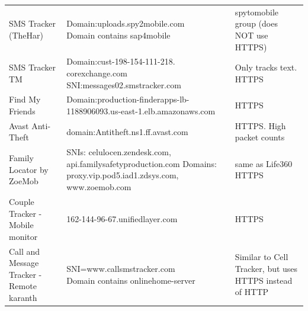 \documentclass[acmtog]{acmart}
\begin{document}
\begin{table}
\begin{tabular}{p{5cm}p{5cm}p{5cm}}
	SMS Tracker (TheHar) & \makecell{Domain:uploads.spy2mobile.com\\ Domain contains sap4mobile} & spytomobile group (does NOT use HTTPS) \\
	
	SMS Tracker TM & \makecell{Domain:cust-198-154-111-218.\\corexchange.com \\ SNI:messages02.smstracker.com} & Only tracks text. HTTPS \\
	
	Find My Friends & Domain:production-finderapps-lb-1188906093.us-east-1.elb.amazonaws.com & HTTPS\\
	
	Avast Anti-Theft & domain:Antitheft.ns1.ff.avast.com& HTTPS. High packet counts\\
	
	Family Locator by ZoeMob & SNIs: celulocen.zendesk.com, api.familysafetyproduction.com
	Domains: proxy.vip.pod5.iad1.zdsys.com, www.zoemob.com & same as Life360
	HTTPS \\
	
	Couple Tracker -Mobile monitor & 162-144-96-67.unifiedlayer.com & HTTPS \\
	
	Call and Message Tracker -Remote karanth & \makecell{SNI=www.callsmstracker.com
	\\Domain contains onlinehome-server} & Similar to Cell Tracker, but uses HTTPS instead of HTTP \\
	

	
\end{tabular}
\end{table}
\end{document}
